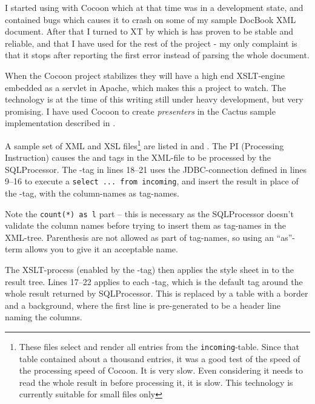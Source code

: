 I started using  with Cocoon which
at that time was in a development state, and contained bugs which
causes it to crash on some of my sample DocBook XML document.  After
that I turned to XT by 
which is has proven to be stable and reliable, and that I have used
for the rest of the project - my only complaint is that it stops after
reporting the first error instead of parsing the whole document.


When the Cocoon project stabilizes they will have a
high end XSLT-engine embedded as a servlet in Apache, which makes this
a project to watch.  The technology is at the time of this writing
still under heavy development, but very promising.  I have used Cocoon
to create \textit{presenters} in the Cactus sample implementation
described in .

A sample set of XML and XSL files\footnote{These files select and
  render all entries from the \texttt{incoming}-table.  Since that
  table contained about a thousand entries, it was a good test of the
  speed of the processing speed of Cocoon.  It is very slow.  Even
  considering it needs to read the whole result in before processing
  it, it is slow.  This technology is currently suitable for small
  files only} are listed in 
  and .  The
   PI (Processing Instruction) causes
  the  and  tags in the XML-file to be
  processed by the SQLProcessor.  The -tag in lines 18--21
  uses the JDBC-connection defined in lines 9--16 to execute a
  \texttt{select ... from incoming}, and insert the result in place of
  the -tag, with the column-names as tag-names.

Note the \texttt{count(*) as l} part -- this is necessary as the
SQLProcessor doesn't validate the column names before trying to insert
them as tag-names in the XML-tree.  Parenthesis are not allowed as
part of tag-names, so using an ``as''-term allows you to give it an
acceptable name.

The XSLT-process (enabled by the -tag) then applies the style sheet in
 to the result tree.  Lines
17--22 applies to each -tag, which is the default tag
around the whole result returned by SQLProcessor.  This is replaced
by a table with a border and a background, where the first line is
pre-generated to be a header line naming the columns.

